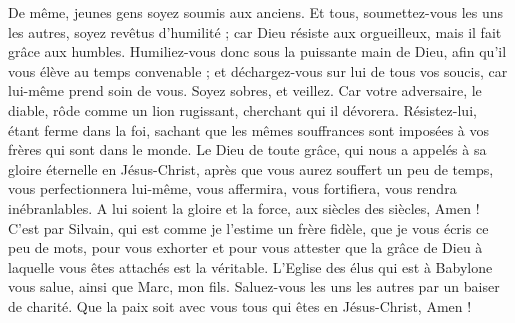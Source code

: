 \begin{multicols}{2}
De même, jeunes gens soyez soumis aux anciens. Et tous, soumettez-vous les uns les autres, soyez revêtus d’humilité ; car Dieu résiste aux orgueilleux, mais il fait grâce aux humbles.
Humiliez-vous donc sous la puissante main de Dieu, afin qu'il vous élève au temps convenable ;
et déchargez-vous sur lui de tous vos soucis, car lui-même prend soin de vous.
Soyez sobres, et veillez. Car votre adversaire, le diable, rôde comme un lion rugissant, cherchant qui il dévorera.
Résistez-lui, étant ferme dans la foi, sachant que les mêmes souffrances sont imposées à vos frères qui sont dans le monde.
Le Dieu de toute grâce, qui nous a appelés à sa gloire éternelle en Jésus-Christ, après que vous aurez souffert un peu de temps, vous perfectionnera lui-même, vous affermira, vous fortifiera, vous rendra inébranlables.
A lui soient la gloire et la force, aux siècles des siècles, Amen !
C’est par Silvain, qui est comme je l’estime un frère fidèle, que je vous écris ce peu de mots, pour vous exhorter et pour vous attester que la grâce de Dieu à laquelle vous êtes attachés est la véritable.
L’Eglise des élus qui est à Babylone vous salue, ainsi que Marc, mon fils.
Saluez-vous les uns les autres par un baiser de charité. Que la paix soit avec vous tous qui êtes en Jésus-Christ, Amen !
\PPE{}
\end{multicols}
